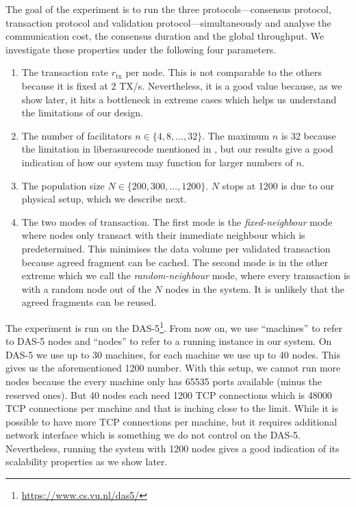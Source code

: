 The goal of the experiment is to run the three protocols---consensus protocol,
transaction protocol and validation protocol---simultaneously and analyse the communication cost, the consensus duration and the global throughput.
We investigate these properties under the following four parameters.
\begin{enumerate}
  \item The transaction rate $r_{\text{tx}}$ per node. This is not comparable to the others because it is fixed at 2 TX/s.
        Nevertheless, it is a good value because, as we show later,
        it hits a bottleneck in extreme cases which helps us understand the limitations of our design.
  \item The number of facilitators $n \in \{4, 8, \dots, 32\}$.
        The maximum $n$ is 32 because the limitation in liberasurecode mentioned in ,
        but our results give a good indication of how our system may function for larger numbers of $n$.
  \item The population size $N \in \{200, 300, \dots, 1200\}$.
        $N$ stops at 1200 is due to our physical setup, which we describe next.
  \item The two modes of transaction.
        The first mode is the \emph{fixed-neighbour} mode where nodes only transact with their immediate neighbour which is predetermined. 
        This minimises the data volume per validated transaction because agreed fragment can be cached.
        The second mode is in the other extreme which we call the \emph{random-neighbour} mode,
        where every transaction is with a random node out of the $N$ nodes in the system.
        It is unlikely that the agreed fragments can be reused.
\end{enumerate}

The experiment is run on the DAS-5\footnote{\url{https://www.cs.vu.nl/das5/}}.
From now on, we use ``machines'' to refer to DAS-5 nodes and ``nodes'' to refer to a running instance in our system.
On DAS-5 we use up to 30 machines, for each machine we use up to 40 nodes.
This gives us the aforementioned 1200 number.
With this setup, we cannot run more nodes because the every machine only has 65535 ports available (minus the reserved ones).
But 40 nodes each need 1200 TCP connections which is 48000 TCP connections per machine and that is inching close to the limit.
While it is possible to have more TCP connections per machine,
but it requires additional network interface which is something we do not control on the DAS-5.
Nevertheless, running the system with 1200 nodes gives a good indication of its scalability properties as we show later.

